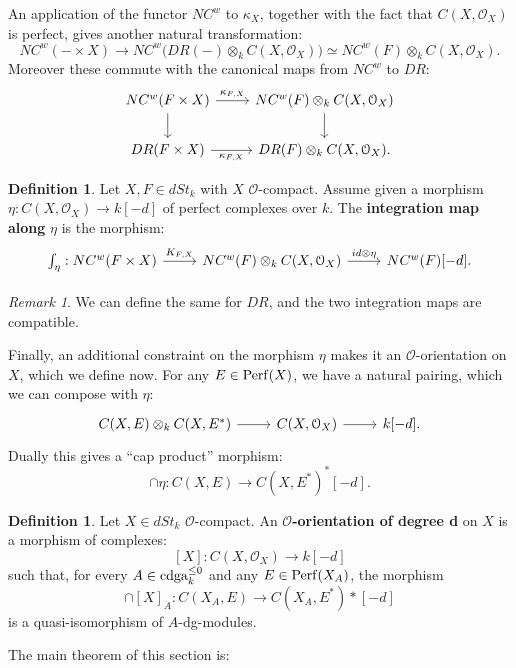\documentclass[10pt,a4paper,reqno,oneside]{book} %
\theoremstyle{plain}
\theoremstyle{definition}
\newtheorem{defin}[thm]{Definition}
\theoremstyle{remark}
\newtheorem{rem}[thm]{Remark}
\numberwithin{equation}{section}
\begin{document}
An application of the functor $NC^w$ to $\kappa_X$, together with the fact that $C(X,\mathcal{O}_X)$ is perfect,
gives another natural transformation:
\[	NC^w(- \times X) \to NC^w\big(DR(-) \otimes_k C(X,\mathcal{O}_X)\big) \simeq NC^w(F) \otimes_k C(X,\mathcal{O}_X) .	\]
Moreover these commute with the canonical maps from $NC^w$ to $DR$:
\[
\begin{tikzcd}
NC^w( F \times X) \arrow{r}{\kappa_{F,X}}\arrow{d} & NC^w(F) \otimes_k C(X,\mathcal{O}_X)\arrow{d} \\
DR( F \times X) \arrow[swap]{r}{\kappa_{F,X}} & DR(F) \otimes_k C(X,\mathcal{O}_X) .
\end{tikzcd}
\]

\begin{defin}
Let $X,F \in dSt_k$ with $X$ $\mathcal{O}$-compact. Assume given a morphism $\eta : C(X,\mathcal{O}_X) \to k[-d]$ of
perfect complexes over $k$. The \textbf{integration map along} $\eta$ is the morphism:
\[
\begin{tikzcd}
\int_{\eta} : NC^w(F\times X) \arrow{r}{K_{F,X}} & NC^w(F) \otimes_k C(X,\mathcal{O}_X) \arrow{r}{id \otimes \eta} &
NC^w(F)[-d] .
\end{tikzcd}
\]
\end{defin}
\begin{rem}
We can define the same for $DR$, and the two integration maps are compatible.
\end{rem}

Finally, an additional constraint on the morphism $\eta$ makes it an $\mathcal{O}$-orientation on $X$, which we define now.
For any $E \in \mathrm{Perf}(X)$, we have a natural pairing, which we can compose with $\eta$:
\[
\begin{tikzcd}
C(X,E) \otimes_k C(X,E^*) \arrow{r} & C(X,\mathcal{O}_X)\arrow{r} & k[-d] .
\end{tikzcd}
\]
Dually this gives a ``cap product'' morphism:
\[	\cap \eta : C(X,E) \to C(X,E^*)^*[-d].	\]

\begin{defin}
Let $X \in dSt_k$ $\mathcal{O}$-compact. An $\mathcal{O}$\textbf{-orientation of degree d} on $X$ is a morphism of complexes:
\[	[X] : C(X,\mathcal{O}_X) \to k[-d]	\]
such that, for every $A \in \operatorname{cdga}_k^{\leq 0}$ and any $E \in \mathrm{Perf}(X_A)$, the morphism
\[	\cap [X]_A : C(X_A,E) \to C(X_A,E^*)*[-d]	\]
is a quasi-isomorphism of $A$-dg-modules.
\end{defin}

The main theorem of this section is:
\end{document}
